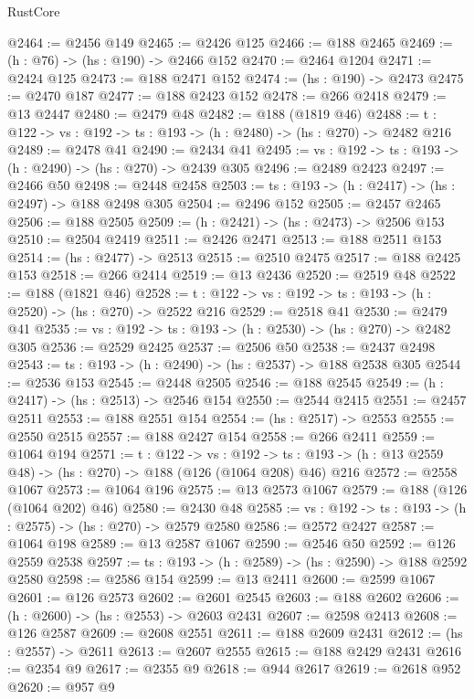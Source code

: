 \begin{lexlean}{RustCore}
\begin{coremodule}
@2464 := @2456 @149
@2465 := @2426 @125
@2466 := @188 @2465
@2469 := (h : @76) -> (hs : @190) -> @2466 @152
@2470 := @2464 @1204
@2471 := @2424 @125
@2473 := @188 @2471 @152
@2474 := (hs : @190) -> @2473
@2475 := @2470 @187
@2477 := @188 @2423 @152
@2478 := @266 @2418
@2479 := @13 @2447
@2480 := @2479 @48
@2482 := @188 (@1819 @46)
@2488 := {t : @122} -> {vs : @192} -> {ts : @193} -> (h : @2480) -> (hs : @270) -> @2482 @216
@2489 := @2478 @41
@2490 := @2434 @41
@2495 := {vs : @192} -> {ts : @193} -> (h : @2490) -> (hs : @270) -> @2439 @305
@2496 := @2489 @2423
@2497 := @2466 @50
@2498 := @2448 @2458
@2503 := {ts : @193} -> (h : @2417) -> (hs : @2497) -> @188 @2498 @305
@2504 := @2496 @152
@2505 := @2457 @2465
@2506 := @188 @2505
@2509 := (h : @2421) -> (hs : @2473) -> @2506 @153
@2510 := @2504 @2419
@2511 := @2426 @2471
@2513 := @188 @2511 @153
@2514 := (hs : @2477) -> @2513
@2515 := @2510 @2475
@2517 := @188 @2425 @153
@2518 := @266 @2414
@2519 := @13 @2436
@2520 := @2519 @48
@2522 := @188 (@1821 @46)
@2528 := {t : @122} -> {vs : @192} -> {ts : @193} -> (h : @2520) -> (hs : @270) -> @2522 @216
@2529 := @2518 @41
@2530 := @2479 @41
@2535 := {vs : @192} -> {ts : @193} -> (h : @2530) -> (hs : @270) -> @2482 @305
@2536 := @2529 @2425
@2537 := @2506 @50
@2538 := @2437 @2498
@2543 := {ts : @193} -> (h : @2490) -> (hs : @2537) -> @188 @2538 @305
@2544 := @2536 @153
@2545 := @2448 @2505
@2546 := @188 @2545
@2549 := (h : @2417) -> (hs : @2513) -> @2546 @154
@2550 := @2544 @2415
@2551 := @2457 @2511
@2553 := @188 @2551 @154
@2554 := (hs : @2517) -> @2553
@2555 := @2550 @2515
@2557 := @188 @2427 @154
@2558 := @266 @2411
@2559 := @1064 @194
@2571 := {t : @122} ->
  {vs : @192} ->
  {ts : @193} -> (h : @13 @2559 @48) -> (hs : @270) -> @188 (@126 (@1064 @208) @46) @216
@2572 := @2558 @1067
@2573 := @1064 @196
@2575 := @13 @2573 @1067
@2579 := @188 (@126 (@1064 @202) @46)
@2580 := @2430 @48
@2585 := {vs : @192} -> {ts : @193} -> (h : @2575) -> (hs : @270) -> @2579 @2580
@2586 := @2572 @2427
@2587 := @1064 @198
@2589 := @13 @2587 @1067
@2590 := @2546 @50
@2592 := @126 @2559 @2538
@2597 := {ts : @193} -> (h : @2589) -> (hs : @2590) -> @188 @2592 @2580
@2598 := @2586 @154
@2599 := @13 @2411
@2600 := @2599 @1067
@2601 := @126 @2573
@2602 := @2601 @2545
@2603 := @188 @2602
@2606 := (h : @2600) -> (hs : @2553) -> @2603 @2431
@2607 := @2598 @2413
@2608 := @126 @2587
@2609 := @2608 @2551
@2611 := @188 @2609 @2431
@2612 := (hs : @2557) -> @2611
@2613 := @2607 @2555
@2615 := @188 @2429 @2431
@2616 := @2354 @9
@2617 := @2355 @9
@2618 := @944 @2617
@2619 := @2618 @952
@2620 := @957 @9

\end{coremodule}
\end{lexlean}
